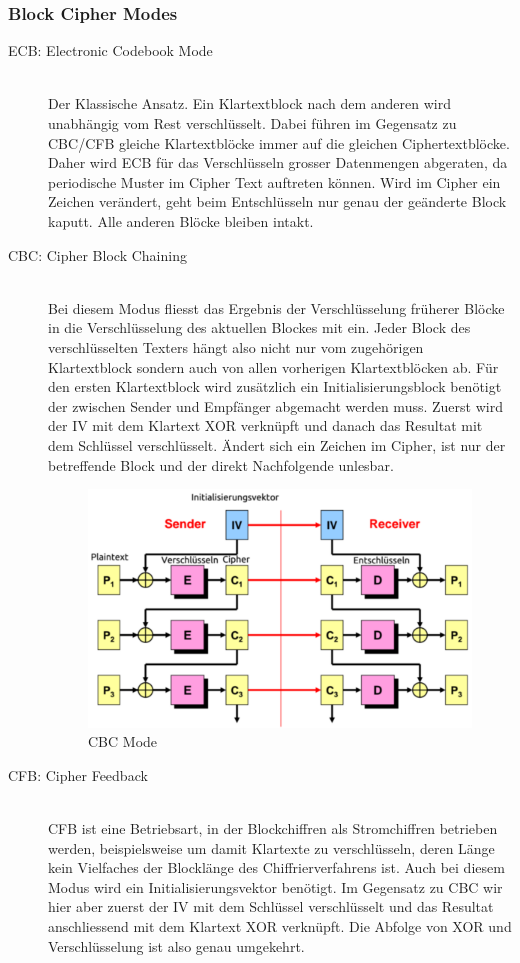 \subsubsection{Block Cipher Modes}
\begin{description}
	\item[ECB: Electronic Codebook Mode] \hfill \\ Der Klassische Ansatz. Ein Klartextblock nach dem anderen wird unabhängig vom Rest verschlüsselt. Dabei führen im Gegensatz zu CBC/CFB gleiche Klartextblöcke immer auf die gleichen Ciphertextblöcke. Daher wird ECB für das Verschlüsseln grosser Datenmengen abgeraten, da periodische Muster im Cipher Text auftreten können. Wird im Cipher ein Zeichen verändert, geht beim Entschlüsseln nur genau der geänderte Block kaputt. Alle anderen Blöcke bleiben intakt.
	\item[CBC: Cipher Block Chaining] \hfill \\ Bei diesem Modus fliesst das Ergebnis der Verschlüsselung früherer Blöcke in die Verschlüsselung des aktuellen Blockes mit ein. Jeder Block des verschlüsselten Texters hängt also nicht nur vom zugehörigen Klartextblock sondern auch von allen vorherigen Klartextblöcken ab. Für den ersten Klartextblock wird zusätzlich ein Initialisierungsblock benötigt der zwischen Sender und Empfänger abgemacht werden muss. Zuerst wird der IV mit dem Klartext XOR verknüpft und danach das Resultat mit dem Schlüssel verschlüsselt. Ändert sich ein Zeichen im Cipher, ist nur der betreffende Block und der direkt Nachfolgende unlesbar.
	\begin{figure}[h!]
		\centering
		\includegraphics[width=0.5\linewidth]{images/cbc}
		\caption{CBC Mode}
	\end{figure}
	\item[CFB: Cipher Feedback] \hfill \\
	CFB ist eine Betriebsart, in der Blockchiffren als Stromchiffren betrieben werden, beispielsweise um damit Klartexte zu verschlüsseln, deren Länge kein Vielfaches der Blocklänge des Chiffrierverfahrens ist. Auch bei diesem Modus wird ein Initialisierungsvektor benötigt. Im Gegensatz zu CBC wir hier aber zuerst der IV mit dem Schlüssel verschlüsselt und das Resultat anschliessend mit dem Klartext XOR verknüpft. Die Abfolge von XOR und Verschlüsselung ist also genau umgekehrt.

\end{description}
